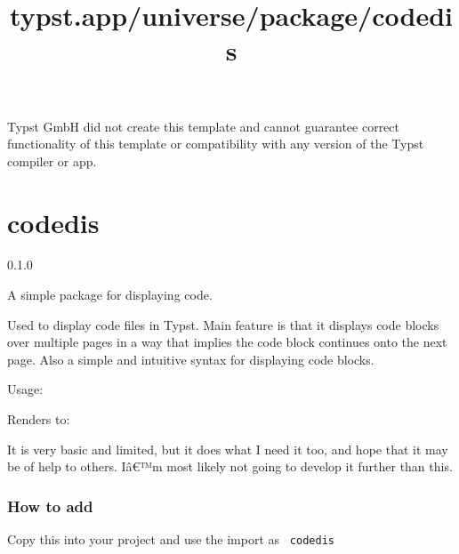 Typst GmbH did not create this template and cannot guarantee correct
functionality of this template or compatibility with any version of the
Typst compiler or app.


\title{typst.app/universe/package/codedis}

\label{banner}
\section{codedis}\label{codedis}

{ 0.1.0 }

A simple package for displaying code.

\label{readme}
Used to display code files in Typst. Main feature is that it displays
code blocks over multiple pages in a way that implies the code block
continues onto the next page. Also a simple and intuitive syntax for
displaying code blocks.

Usage:

\begin{Shaded}
\begin{Highlighting}[]



\end{Highlighting}
\end{Shaded}

Renders to:

It is very basic and limited, but it does what I need it too, and hope
that it may be of help to others. Iâ€™m most likely not going to develop
it further than this.

\subsubsection{How to add}\label{how-to-add}

Copy this into your project and use the import as \texttt{\ codedis\ }

